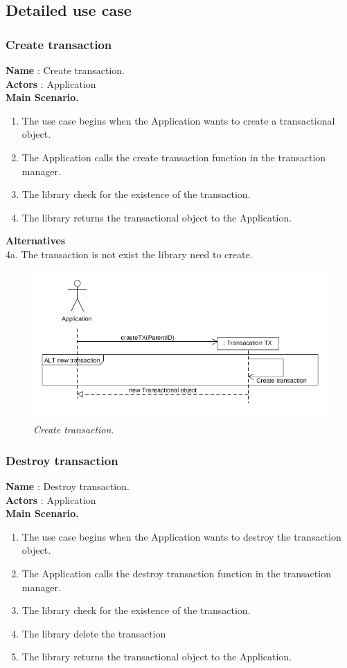 \documentclass[12pt]{article}
\begin{document}
\subsection{Detailed use case}
{\setlength{\parindent}{0cm}
\subsubsection{Create transaction}
\textbf{Name} : Create transaction.\\
\textbf{Actors} : Application\\
\textbf{Main Scenario.}
\begin{enumerate}
  \item The use case begins when the Application wants to create a transactional object.
  \item The Application calls the create transaction function in the transaction manager.
  \item The library check for the existence of the transaction.
  \item The library returns the transactional object to the Application.
\end{enumerate}
\textbf{Alternatives}\\
4a. The transaction is not exist the library need to create.\\

\begin{figure}[h!]
\centering
\includegraphics[scale=0.4]{Pictures/create.png}
\caption{\textit{\color{gray}Create transaction.}}
\end{figure}


\subsubsection{Destroy transaction}
\textbf{Name} : Destroy transaction.\\
\textbf{Actors} : Application\\
\textbf{Main Scenario.}
\begin{enumerate}
  \item The use case begins when the Application wants to destroy the transaction object.
  \item The Application calls the destroy transaction function in the transaction manager.
  \item The library check for the existence of the transaction.
  \item The library delete the transaction  
  \item The library returns the transactional object to the Application.
\end{enumerate}


}
\end{document}
